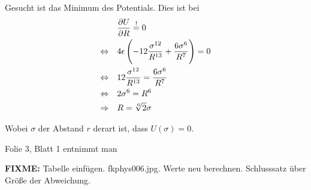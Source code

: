 \documentclass[a4paper,german,12pt,smallheadings]{scrartcl}
\begin{document}
\begin{enumerate}[a)]
    Gesucht ist das Minimum des Potentials. Dies ist bei
    \begin{align}
      &\frac{\partial U}{\partial R} \overset{!}{=} 0 \\
      \Leftrightarrow \quad &
      4 \epsilon \del{-12\frac{\sigma^{12}}{R^{13}} + \frac{6\sigma^6}{R^7}} = 0 \\
      \Leftrightarrow \quad &
      12\frac{\sigma^{12}}{R^{13}} = \frac{6\sigma^6}{R^7} \\
      \Leftrightarrow \quad &
      2 \sigma^6 = R^6 \\
      \Rightarrow \quad & R = \sqrt[6]{2} \sigma
    \end{align}

    Wobei $\sigma$ der Abstand $r$ derart ist, dass $U(\sigma) = 0$.

    Folie 3, Blatt 1 entnimmt man

    \textbf{FIXME:} Tabelle einfügen. fkphys006.jpg. Werte neu berechnen. Schlusssatz über Größe der Abweichung.
\end{enumerate}
\end{document}
